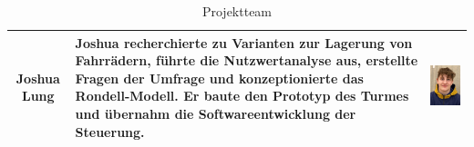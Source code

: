 \begin{table}[H]
\begin{tabular}{cp{}c}
    \midrule
    Joshua Lung   & Joshua recherchierte zu Varianten zur Lagerung von Fahrrädern, führte die Nutzwertanalyse aus, erstellte Fragen der Umfrage und konzeptionierte das Rondell-Modell. Er baute den Prototyp des Turmes und übernahm die Softwareentwicklung der Steuerung. & \begin{minipage}{.3\textwidth}\includegraphics{images/joshualung.jpg} \end{minipage}    \\
    \bottomrule
  \end{tabular}
  \caption{Projektteam}
  \label{tab:projektteam}
\end{table}

